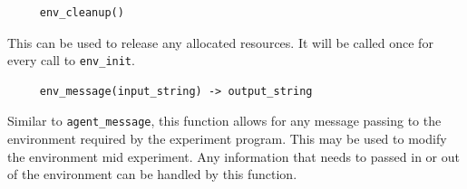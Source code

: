 \documentclass[11pt]{article}
\begin{document}
% 
% 
% 

\begin{verbatim}                 
     env_cleanup()\end{verbatim}
This can be used to release any allocated resources. It will be called once for every call to \texttt{env\_init}.

\begin{verbatim}
     env_message(input_string) -> output_string
\end{verbatim}
Similar to \texttt{agent\_message}, this function allows for any message passing to the environment required by the experiment program. This may be used to modify the environment mid experiment. Any information that needs to passed in or out of the environment can be handled by this function.
\end{document}
